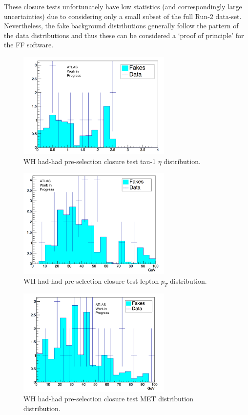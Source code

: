 These closure tests unfortunately have low statistics (and correspondingly large uncertainties) due to considering only a small subset of the full Run-2 data-set.  Nevertheless, the fake background distributions generally follow the pattern of the data distributions and thus these can be considered a `proof of principle' for the FF software.

\begin{figure}[htb!]
    \centering
    \includegraphics[width=3in]{figures/chapter7/tau1_eta_whpresel.png}
    \caption{WH had-had pre-selection closure test tau-1 $\eta$ distribution.}
    \label{fig:presel_taueta}
\end{figure}

\begin{figure}[htb!]
    \centering
    \includegraphics[width=3in]{figures/chapter7/lep_pt_wh_presel.png}
    \caption{WH had-had pre-selection closure test lepton $p_T$ distribution.}
    \label{fig:presel_leppt}
\end{figure}

\pagebreak

\begin{figure}[htb!]
    \centering
    \includegraphics[width=3in]{figures/chapter7/met_whpresel.png}
    \caption{WH had-had pre-selection closure test MET distribution distribution.}
    \label{fig:presel_met}
\end{figure}

